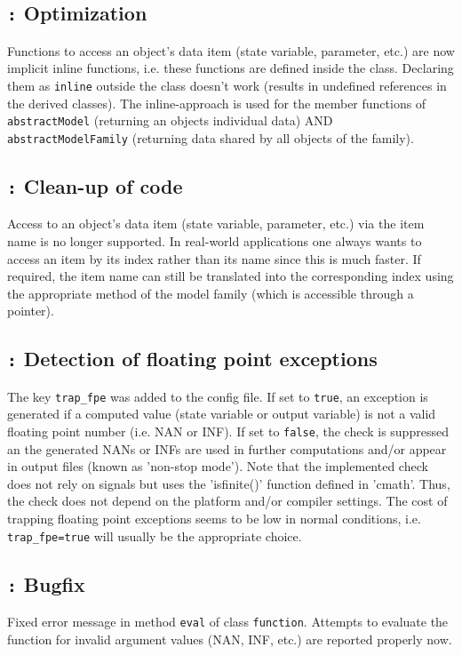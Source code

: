\documentclass[a4paper,10pt]{article}
\newcommand{\logentry}[2]{\subsection*{\texttt{\color{red}{#1}:} \large{\textbf{#2}}}}
\begin{document}

\logentry{2011-10-11}{Optimization} Functions to access an object's data item (state variable, parameter, etc.) are now implicit inline functions, i.e. these functions are defined inside the class. Declaring them as \verb!inline! outside the class doesn't work (results in undefined references in the derived classes). The inline-approach is used for the member functions of \verb!abstractModel! (returning an objects individual data) AND \verb!abstractModelFamily! (returning data shared by all objects of the family).


\logentry{2011-10-11}{Clean-up of code}
Access to an object's data item (state variable, parameter, etc.) via the item name is no longer supported. In real-world applications one always wants to access an item by its index rather than its name since this is much faster. If required, the item name can still be translated into the corresponding index using the appropriate method of the model family (which is accessible through a pointer).


\logentry{2011-10-07}{Detection of floating point exceptions}
The key \verb!trap_fpe! was added to the config file. If set to \verb!true!, an exception is generated if a computed value (state variable or output variable) is not a valid floating point number (i.e. NAN or INF). If set to \verb!false!, the check is suppressed an the generated NANs or INFs are used in further computations and/or appear in output files (known as 'non-stop mode'). Note that the implemented check does not rely on signals but uses the 'isfinite()' function defined in 'cmath'. Thus, the check does not depend on the platform and/or compiler settings. The cost of trapping floating point exceptions seems to be low in normal conditions, i.e. \verb!trap_fpe=true! will usually be the appropriate choice.


\logentry{2011-10-06}{Bugfix}
Fixed error message in method \verb!eval! of class \verb!function!. Attempts to evaluate the function for invalid argument values (NAN, INF, etc.) are reported properly now.
\end{document}
